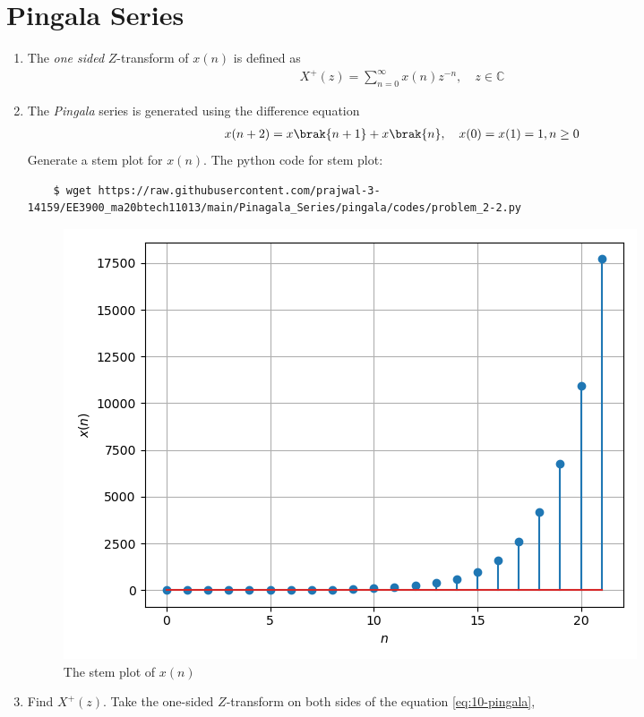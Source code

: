 \documentclass[journal,12pt,twocolumn]{IEEEtran}
\renewcommand\thesection{\arabic{section}}
\begin{document}
\section{Pingala Series}
\begin{enumerate}[label=\thesection.\arabic*,ref=\thesection.\theenumi]
\item The {\em one sided} $Z$-transform of $x(n)$ is defined as 
\begin{align}
	X^{+}(z) = \sum_{n = 0}^{\infty}x(n)z^{-n}, \quad z \in \mathbb{C}
	\label{eq:one-Z}
\end{align}
\item The {\em Pingala} series is generated using the difference equation 
\begin{align}
	x(n+2) = x\brak{n+1} + x\brak{n}, \quad x(0) = x(1) = 1, n \ge 0
	\label{eq:10-pingala}
\end{align}
Generate a stem plot for $x(n)$.
\solution The python code for stem plot:
\begin{lstlisting}
	$ wget https://raw.githubusercontent.com/prajwal-3-14159/EE3900_ma20btech11013/main/Pinagala_Series/pingala/codes/problem_2-2.py
\end{lstlisting}
\begin{figure}[!ht]
	\centering
	\includegraphics[width=\columnwidth]{./figs/prob_2-2.png}
	\caption{The stem plot of $x(n)$}
	\label{fig:xnyn}
\end{figure}
\item  Find $X^{+}(z)$.
\solution Take the one-sided $Z$-transform on both sides of the equation \eqref{eq:10-pingala},
\begin{align}

\end{align}
\end{enumerate}
\end{document}
